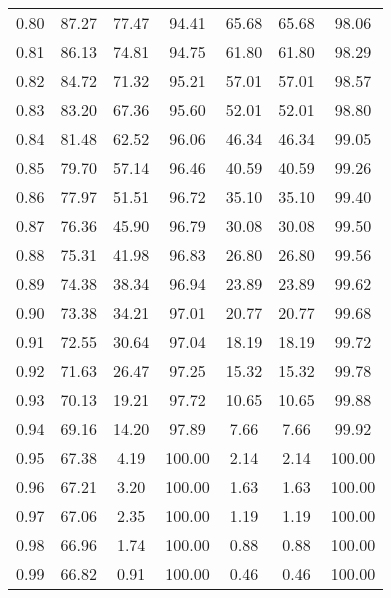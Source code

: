 \begin{tabular}{|c|c|c|c|c|c|c|}
      0.80 &     87.27 &     77.47 &      94.41 &   65.68 &      65.68 &         98.06 \\
      0.81 &     86.13 &     74.81 &      94.75 &   61.80 &      61.80 &         98.29 \\
      0.82 &     84.72 &     71.32 &      95.21 &   57.01 &      57.01 &         98.57 \\
      0.83 &     83.20 &     67.36 &      95.60 &   52.01 &      52.01 &         98.80 \\
      0.84 &     81.48 &     62.52 &      96.06 &   46.34 &      46.34 &         99.05 \\
      0.85 &     79.70 &     57.14 &      96.46 &   40.59 &      40.59 &         99.26 \\
      0.86 &     77.97 &     51.51 &      96.72 &   35.10 &      35.10 &         99.40 \\
      0.87 &     76.36 &     45.90 &      96.79 &   30.08 &      30.08 &         99.50 \\
      0.88 &     75.31 &     41.98 &      96.83 &   26.80 &      26.80 &         99.56 \\
      0.89 &     74.38 &     38.34 &      96.94 &   23.89 &      23.89 &         99.62 \\
      0.90 &     73.38 &     34.21 &      97.01 &   20.77 &      20.77 &         99.68 \\
      0.91 &     72.55 &     30.64 &      97.04 &   18.19 &      18.19 &         99.72 \\
      0.92 &     71.63 &     26.47 &      97.25 &   15.32 &      15.32 &         99.78 \\
      0.93 &     70.13 &     19.21 &      97.72 &   10.65 &      10.65 &         99.88 \\
      0.94 &     69.16 &     14.20 &      97.89 &    7.66 &       7.66 &         99.92 \\
      0.95 &     67.38 &      4.19 &     100.00 &    2.14 &       2.14 &        100.00 \\
      0.96 &     67.21 &      3.20 &     100.00 &    1.63 &       1.63 &        100.00 \\
      0.97 &     67.06 &      2.35 &     100.00 &    1.19 &       1.19 &        100.00 \\
      0.98 &     66.96 &      1.74 &     100.00 &    0.88 &       0.88 &        100.00 \\
      0.99 &     66.82 &      0.91 &     100.00 &    0.46 &       0.46 &        100.00 \\
\bottomrule
\end{tabular}
